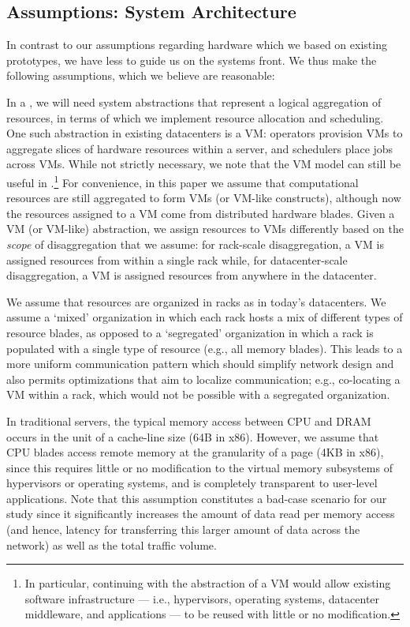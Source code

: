 \vspace{-0.1in}
\subsection{Assumptions: System Architecture}
\vspace{-0.05in}
\label{ssec:system}
In contrast to our assumptions regarding hardware which we based on existing  prototypes, we have less to guide us on the systems front. We thus make the following assumptions, which we believe are reasonable: 

In a \dis, we will need system abstractions that represent a logical aggregation of resources, in terms of which we implement resource allocation and scheduling. 
One such abstraction in existing datacenters is a VM: 
operators provision VMs to aggregate slices of hardware resources within a server, and schedulers place jobs across VMs. 
While not strictly necessary, we note that the VM model can still be useful in \dis.\footnote{In particular, continuing with the abstraction of a VM would allow existing software infrastructure --- i.e., hypervisors, operating systems, datacenter middleware, and applications --- to be reused with little or no modification.} 
For convenience, in this paper we assume that computational resources are still aggregated to form VMs (or VM-like constructs), although now the resources assigned to a VM come from distributed hardware blades. Given a VM (or VM-like) abstraction, we assign resources to VMs differently based on the \emph{scope} of disaggregation that we assume: for rack-scale disaggregation, a VM is assigned resources from within a single rack while, for datacenter-scale disaggregation, a VM is assigned resources from anywhere in the datacenter.

We assume that resources are organized in racks as in today's datacenters. 
We assume a `mixed' organization in which each rack hosts a mix of different types of resource blades, as opposed to a `segregated' organization in which a rack is populated with a single type of resource (e.g., all memory blades). 
This leads to a more uniform communication pattern which should simplify network design and also permits optimizations that aim to localize communication; e.g., co-locating a VM within a rack, which would not be possible with a segregated organization. 

 
In traditional servers, the typical memory access between CPU and DRAM occurs in the unit of a cache-line size (64B in x86). However, we assume that CPU blades access remote memory at the granularity of a page (4KB in x86), since this requires little or no modification to the virtual memory subsystems of hypervisors or operating systems, and is completely transparent to user-level applications. Note that this assumption constitutes a bad-case scenario for our study since it significantly increases the amount of data read per memory access (and hence, latency for transferring this larger amount of data across the network) as well as the total traffic volume.

